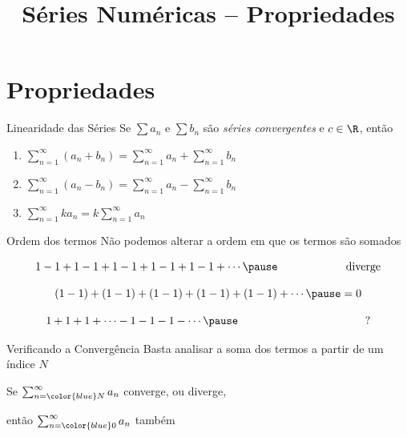 \documentclass[fleqn,utf8,aspectratio=169,12pt]{beamer}
\title{Séries Numéricas -- Propriedades}
\begin{document}
\addtitle

\section{Propriedades}

\begin{frame}{Linearidade das Séries}
  Se \(\sum a_n\) e \(\sum b_n\)
  são \emph{séries convergentes} e $c\in\R$,
  \pause
  então

  \vspace{\baselineskip}
  \begin{enumerate}[<+->]
    \setlength\itemsep{1em}
    \item \( \sum_{n=1}^\infty (a_n+b_n) =  \sum_{n=1}^\infty a_n +\sum_{n=1}^\infty b_n \)
    \item \( \sum_{n=1}^\infty (a_n-b_n) =  \sum_{n=1}^\infty a_n -\sum_{n=1}^\infty b_n \)
    \item \( \sum_{n=1}^\infty ka_n      = k\sum_{n=1}^\infty a_n \)
  \end{enumerate}
\end{frame}

\begin{frame}{Ordem dos termos}
  Não podemos alterar a ordem em que os termos são somados

  \pause
  \[
    1-1+1-1+1-1+1-1+1-1+\cdots
    \pause
    \hspace{21.5mm}\text{diverge}
  \]

  \pause
  \[
    (1-1)+(1-1)+(1-1)+(1-1)+(1-1)+\cdots
    \pause
    = 0
  \]

  \pause
  \[
    1 + 1 + 1 + \cdots - 1 - 1 - 1 - \cdots
    \pause
    \hspace{40mm}\text{?}
  \]
\end{frame}

\begin{frame}{Verificando a Convergência}
  Basta analisar a soma dos termos a partir de um índice $N$

  \pause
  \vspace{\baselineskip}
  Se \tabto{15mm}
  \(
    \sum_{n={\color{blue}N}}^\infty a_n
  \)
  \tabto{35mm}
  converge, ou diverge,

  \pause
  \vspace{\baselineskip}
  então \tabto{15mm}
  \(
    \sum_{n={\color{blue}0}}^\infty a_n
  \)
  \tabto{35mm}
  também
\end{frame}
\end{document}
